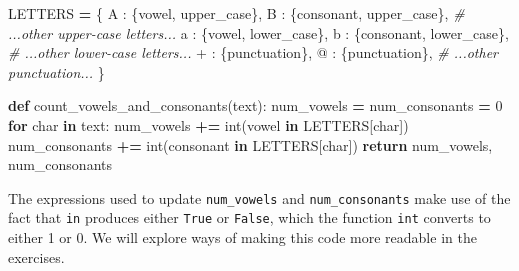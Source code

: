 \documentclass[
]{krantz}
\makeatletter
\newenvironment{Shaded}{\begin{snugshade}}{\end{snugshade}}
\newcommand{\BuiltInTok}[1]{#1}
\newcommand{\CommentTok}[1]{\textcolor[rgb]{0.56,0.35,0.01}{\textit{#1}}}
\newcommand{\ControlFlowTok}[1]{\textcolor[rgb]{0.13,0.29,0.53}{\textbf{#1}}}
\newcommand{\DecValTok}[1]{\textcolor[rgb]{0.00,0.00,0.81}{#1}}
\newcommand{\KeywordTok}[1]{\textcolor[rgb]{0.13,0.29,0.53}{\textbf{#1}}}
\newcommand{\NormalTok}[1]{#1}
\newcommand{\OperatorTok}[1]{\textcolor[rgb]{0.81,0.36,0.00}{\textbf{#1}}}
\newcommand{\StringTok}[1]{\textcolor[rgb]{0.31,0.60,0.02}{#1}}
\newenvironment{kframe}{%
\medskip{}
\setlength{\fboxsep}{.8em}
 \def\at@end@of@kframe{}%
 \ifinner\ifhmode%
  \def\at@end@of@kframe{\end{minipage}}%
  \begin{minipage}{\columnwidth}%
 \fi\fi%
 \def\FrameCommand##1{\hskip\@totalleftmargin \hskip-\fboxsep
 \colorbox{shadecolor}{##1}\hskip-\fboxsep
     \hskip-\linewidth \hskip-\@totalleftmargin \hskip\columnwidth}%
 \MakeFramed {\advance\hsize-\width
   \@totalleftmargin\z@ \linewidth\hsize
   \@setminipage}}%
 {\par\unskip\endMakeFramed%
 \at@end@of@kframe}
\renewenvironment{Shaded}{\begin{kframe}}{\end{kframe}}
\makeatother
\begin{document}
\begin{Shaded}
\begin{Highlighting}[]
\NormalTok{LETTERS }\OperatorTok{=}\NormalTok{ \{}
    \StringTok{\textquotesingle{}A\textquotesingle{}}\NormalTok{ : \{}\StringTok{\textquotesingle{}vowel\textquotesingle{}}\NormalTok{, }\StringTok{\textquotesingle{}upper\_case\textquotesingle{}}\NormalTok{\},}
    \StringTok{\textquotesingle{}B\textquotesingle{}}\NormalTok{ : \{}\StringTok{\textquotesingle{}consonant\textquotesingle{}}\NormalTok{, }\StringTok{\textquotesingle{}upper\_case\textquotesingle{}}\NormalTok{\},}
    \CommentTok{\# ...other upper{-}case letters...}
    \StringTok{\textquotesingle{}a\textquotesingle{}}\NormalTok{ : \{}\StringTok{\textquotesingle{}vowel\textquotesingle{}}\NormalTok{, }\StringTok{\textquotesingle{}lower\_case\textquotesingle{}}\NormalTok{\},}
    \StringTok{\textquotesingle{}b\textquotesingle{}}\NormalTok{ : \{}\StringTok{\textquotesingle{}consonant\textquotesingle{}}\NormalTok{, }\StringTok{\textquotesingle{}lower\_case\textquotesingle{}}\NormalTok{\},}
    \CommentTok{\# ...other lower{-}case letters...}
    \StringTok{\textquotesingle{}+\textquotesingle{}}\NormalTok{ : \{}\StringTok{\textquotesingle{}punctuation\textquotesingle{}}\NormalTok{\},}
    \StringTok{\textquotesingle{}@\textquotesingle{}}\NormalTok{ : \{}\StringTok{\textquotesingle{}punctuation\textquotesingle{}}\NormalTok{\},}
    \CommentTok{\# ...other punctuation...}
\NormalTok{\}}

\KeywordTok{def}\NormalTok{ count\_vowels\_and\_consonants(text):}
\NormalTok{    num\_vowels }\OperatorTok{=}\NormalTok{ num\_consonants }\OperatorTok{=} \DecValTok{0}
    \ControlFlowTok{for}\NormalTok{ char }\KeywordTok{in}\NormalTok{ text:}
\NormalTok{        num\_vowels }\OperatorTok{+=} \BuiltInTok{int}\NormalTok{(}\StringTok{\textquotesingle{}vowel\textquotesingle{}} \KeywordTok{in}\NormalTok{ LETTERS[char])}
\NormalTok{        num\_consonants }\OperatorTok{+=} \BuiltInTok{int}\NormalTok{(}\StringTok{\textquotesingle{}consonant\textquotesingle{}} \KeywordTok{in}\NormalTok{ LETTERS[char])}
    \ControlFlowTok{return}\NormalTok{ num\_vowels, num\_consonants}
\end{Highlighting}
\end{Shaded}

The expressions used to update \texttt{num\_vowels} and \texttt{num\_consonants} make use of the fact that
\texttt{in} produces either \texttt{True} or \texttt{False},
which the function \texttt{int} converts to either 1 or 0.
We will explore ways of making this code more readable in the exercises.
\end{document}
